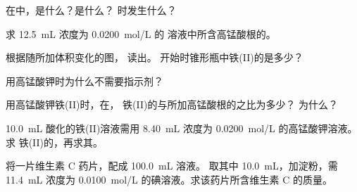 \begin{exercise}[$\star$]\label{exo:g11:titration:1}
在中，是什么？是什么？
时发生什么？
\end{exercise}

\begin{exercise}[$\star$]\label{exo:g11:titration:2}
求 \qty{12.5}{mL} 浓度为 \qty{0.0200}{mol/L} 的
溶液中所含高锰酸根的。
\end{exercise}

\begin{exercise}[$\star$]\label{exo:g11:titration:3}
根据随所加体积变化的图，
读出。
开始时锥形瓶中铁(II)的是多少？
\end{exercise}

\begin{exercise}[$\star$]\label{exo:g11:titration:4}
用高锰酸钾时为什么不需要指示剂？
\end{exercise}

\begin{exercise}[$\star$]\label{exo:g11:titration:5}
用高锰酸钾铁(II)时，在，
铁(II)的与所加高锰酸根的之比为多少？
为什么？
\end{exercise}

\begin{exercise}[$\star\star$]\label{exo:g11:titration:6}
\qty{10.0}{mL} 酸化的铁(II)溶液需用 \qty{8.40}{mL}
浓度为 \qty{0.0200}{mol/L} 的高锰酸钾溶液。求
铁(II)的，再求其。
\end{exercise}

\begin{exercise}[$\star\star$]\label{exo:g11:titration:7}
将一片维生素 C 药片，配成 \qty{100.0}{mL} 溶液。
取其中 \qty{10.0}{mL}，加淀粉，需 \qty{11.4}{mL} 浓度为
\qty{0.0100}{mol/L} 的碘溶液。求该药片所含维生素 C 的质量。
\end{exercise}

